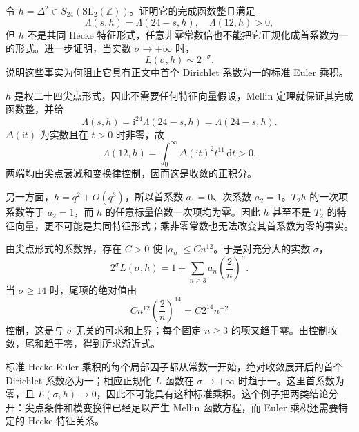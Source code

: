 \begin{exercise}\label{b3:ex:E-8}
令 \(h=\Delta^2\in S_{24}(\mathrm{SL}_2(\mathbb Z))\)。证明它的完成函数整且满足
\[
 \Lambda(s,h)=\Lambda(24-s,h),
 \quad\Lambda(12,h)>0,
\]
但 \(h\) 不是共同 Hecke 特征形式，任意非零常数倍也不能把它正规化成首系数为一的形式。进一步证明，当实数 \(\sigma\to+\infty\) 时，
\[
 L(\sigma,h)\sim2^{-\sigma}.
\]
说明这些事实为何阻止它具有正文中首个 Dirichlet 系数为一的标准 Euler 乘积。
\end{exercise}
\begin{solution}
\(h\) 是权二十四尖点形式，因此不需要任何特征向量假设，Mellin 定理就保证其完成函数整，并给
\[
 \Lambda(s,h)=\mathrm{i}^{24}\Lambda(24-s,h)
             =\Lambda(24-s,h).
\]
\(\Delta(\mathrm{i}t)\) 为实数且在 \(t>0\) 时非零，故
\[
 \Lambda(12,h)=\int_0^\infty\Delta(\mathrm{i}t)^2t^{11}\,\mathrm{d}t>0.
\]
两端均由尖点衰减和变换律控制，因而这是收敛的正积分。

另一方面，\(h=q^2+O(q^3)\)，所以首系数 \(a_1=0\)、次系数 \(a_2=1\)。\(T_2h\) 的一次项系数等于 \(a_2=1\)，而 \(h\) 的任意标量倍数一次项均为零。因此 \(h\) 甚至不是 \(T_2\) 的特征向量，更不可能是共同特征形式；乘非零常数也无法改变其首系数为零的事实。

由尖点形式的系数界，存在 \(C>0\) 使 \(|a_n|\le Cn^{12}\)。于是对充分大的实数 \(\sigma\)，
\[
 2^\sigma L(\sigma,h)
 =1+\sum_{n\ge3}a_n\left(\frac2n\right)^\sigma.
\]
当 \(\sigma\ge14\) 时，尾项的绝对值由
\[
 Cn^{12}\left(\frac2n\right)^{14}
 =C2^{14}n^{-2}
\]
控制，这是与 \(\sigma\) 无关的可求和上界；每个固定 \(n\ge3\) 的项又趋于零。由控制收敛，尾和趋于零，得到所求渐近式。

标准 Hecke Euler 乘积的每个局部因子都从常数一开始，绝对收敛展开后的首个 Dirichlet 系数必为一；相应正规化 \(L\)-函数在 \(\sigma\to+\infty\) 时趋于一。这里首系数为零，且 \(L(\sigma,h)\to0\)，因此不可能具有这种标准乘积。这个例子把两类结论分开：尖点条件和模变换律已经足以产生 Mellin 函数方程，而 Euler 乘积还需要特定的 Hecke 特征关系。
\end{solution}
